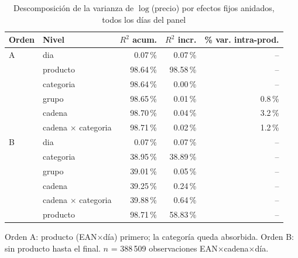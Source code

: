 \begin{table}[htbp]
\caption{Descomposici\'on de la varianza de $\log$(precio) por efectos fijos anidados, todos los d\'ias del panel}
\label{tab:varianza}
\centering\scriptsize\setlength{\tabcolsep}{3pt}
\begin{tabular}{@{}llrrr@{}}
\toprule
Orden & Nivel & $R^2$ acum. & $R^2$ incr. & \% var. intra-prod. \\
\midrule
A & dia & 0.07\,\% & 0.07\,\% & -- \\
 & producto & 98.64\,\% & 98.58\,\% & -- \\
 & categoria & 98.64\,\% & 0.00\,\% & -- \\
 & grupo & 98.65\,\% & 0.01\,\% & 0.8\,\% \\
 & cadena & 98.70\,\% & 0.04\,\% & 3.2\,\% \\
 & cadena $\times$ categoria & 98.71\,\% & 0.02\,\% & 1.2\,\% \\
\midrule
B & dia & 0.07\,\% & 0.07\,\% & -- \\
 & categoria & 38.95\,\% & 38.89\,\% & -- \\
 & grupo & 39.01\,\% & 0.05\,\% & -- \\
 & cadena & 39.25\,\% & 0.24\,\% & -- \\
 & cadena $\times$ categoria & 39.88\,\% & 0.64\,\% & -- \\
 & producto & 98.71\,\% & 58.83\,\% & -- \\
\bottomrule\end{tabular}
\par\smallskip\raggedright\scriptsize Orden A: producto (EAN$\times$d\'ia) primero; la categor\'ia queda absorbida. Orden B: sin producto hasta el final. $n$ = 388\,509 observaciones EAN$\times$cadena$\times$d\'ia.
\end{table}
